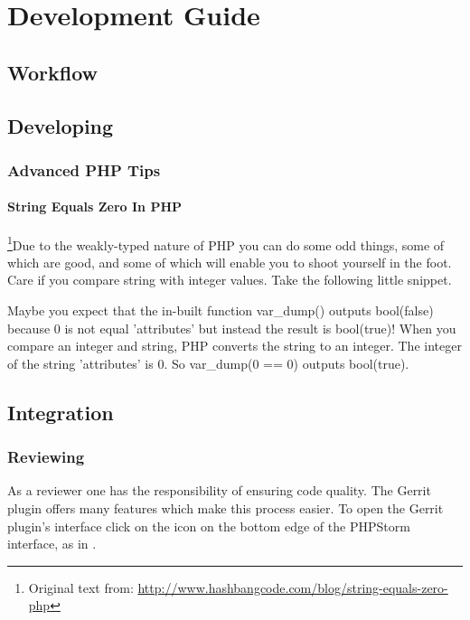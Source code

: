 \chapter{Development Guide}

\section{Workflow}

\section{Developing}

\subsection{Advanced PHP Tips}
\subsubsection{String Equals Zero In PHP}
\footnote{Original text from: \url{http://www.hashbangcode.com/blog/string-equals-zero-php}}Due to the weakly-typed nature of PHP you can do some odd things, some of which are good, and some of which will enable you to shoot yourself in the foot. Care if you compare string with integer values. Take the following little snippet.


Maybe you expect that the in-built function var\_dump() outputs bool(false) because 0 is not equal 'attributes' but instead the result is bool(true)! When you compare an integer and string, PHP converts the string to an integer. The integer of the string 'attributes' is 0. So var\_dump(0 == 0) outputs bool(true).

\section{Integration}

\subsection{Reviewing}

As a reviewer one has the responsibility of ensuring code quality. The Gerrit plugin offers many features which make this process easier. To open the Gerrit plugin's interface click on the icon on the bottom edge of the PHPStorm interface, as in .

